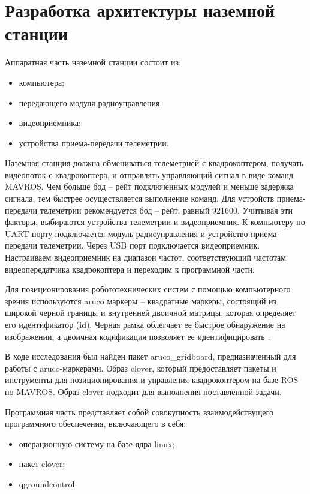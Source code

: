\section{Разработка архитектуры наземной станции}
Аппаратная часть наземной станции состоит из:
\begin{itemize}
	\item компьютера;
	\item передающего модуля радиоуправления;
	\item видеоприемника;
	\item устройства приема-передачи телеметрии.
\end{itemize}

Наземная станция должна обмениваться телеметрией с квадрокоптером, получать видеопоток с квадрокоптера, и отправлять управляющий сигнал в виде команд MAVROS. Чем больше бод -- рейт подключенных модулей и меньше задержка сигнала, тем быстрее осуществляется выполнение команд. Для устройств приема-передачи телеметрии рекомендуется бод -- рейт, равный 921600. Учитывая эти факторы, выбираются устройства телеметрии и видеоприемник.
К компьютеру по UART порту подключается модуль радиоуправления и устройство приема-передачи телеметрии. Через USB порт подключается видеоприемник. Настраиваем видеоприемник на диапазон частот, соответствующий частотам видеопередатчика квадрокоптера и переходим к программной части.

Для позиционирования робототехнических систем с помощью компьютерного зрения используются aruco маркеры -- квадратные маркеры, состоящий из широкой черной границы и внутренней двоичной матрицы, которая определяет его идентификатор (id). Черная рамка облегчает ее быстрое обнаружение на изображении, а двоичная кодификация позволяет ее идентифицировать \cite{opencv}.

В ходе исследования был найден пакет aruco\_gridboard, предназначенный для работы с aruco-маркерами. Образ clover, который предоставляет пакеты и инструменты для позиционирования и управления квадрокоптером на базе ROS по MAVROS. Образ clover подходит для выполнения поставленной задачи.

Программная часть представляет собой совокупность взаимодействущего программного обеспечения, включающего в себя:
\begin{itemize}
	\item операционную систему на базе ядра linux;
	\item пакет clover;
	\item qgroundcontrol.
\end{itemize}

